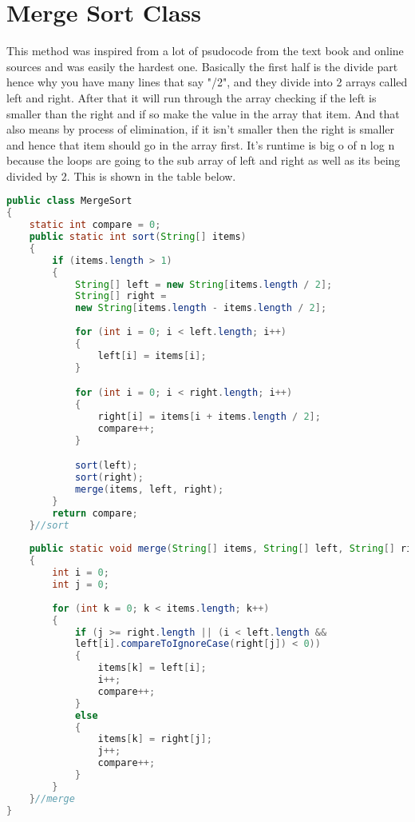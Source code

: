 \documentclass[letterpaper, 10pt]{article}
\begin{document}
\section{Merge Sort Class}
This method was inspired from a lot of psudocode from the text book and online sources and was easily the hardest one. Basically the first half is the divide part hence why you have many lines that say "/2", and they divide into 2 arrays called left and right. After that it will run through the array checking if the left is smaller than the right and if so make the value in the array that item. And that also means by process of elimination, if it isn't smaller then the right is smaller and hence that item should go in the array first. It's runtime is big o of n log n because the loops are going to the sub array of left and right as well as its being divided by 2. This is shown in the table below.
\begin{lstlisting}[language = java]
public class MergeSort 
{
	static int compare = 0;
	public static int sort(String[] items)
	{
		if (items.length > 1)
		{
			String[] left = new String[items.length / 2];
			String[] right = 
			new String[items.length - items.length / 2];
			
			for (int i = 0; i < left.length; i++) 
			{
                left[i] = items[i];
            }

            for (int i = 0; i < right.length; i++) 
            {
                right[i] = items[i + items.length / 2];
                compare++;
            }

            sort(left);
            sort(right);
            merge(items, left, right);
		}
		return compare;
	}//sort
	
	public static void merge(String[] items, String[] left, String[] right)
	{
		int i = 0;
		int j = 0;
		
		for (int k = 0; k < items.length; k++)
		{
			if (j >= right.length || (i < left.length && 
			left[i].compareToIgnoreCase(right[j]) < 0))
			{
				items[k] = left[i];
				i++;
				compare++;
			}
			else
			{
				items[k] = right[j];
				j++;
				compare++;
			}
		}
	}//merge
}


\end{lstlisting}
\end{document}
